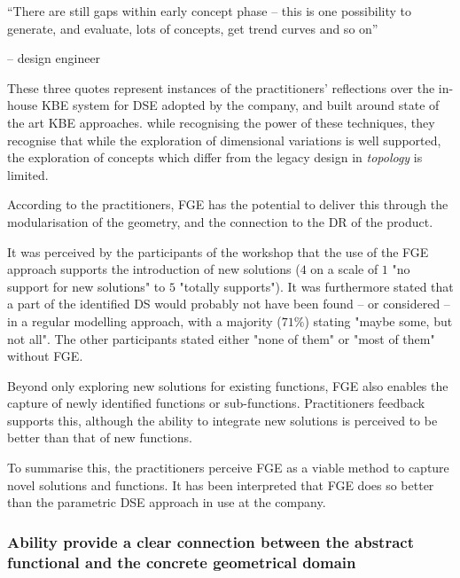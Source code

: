 \documentclass[preprints,article,accept,moreauthors,pdftex]{Definitions/mdpi}
\begin{document}
\begin{center}
    “There are still gaps within early concept phase – this is one possibility to generate, and evaluate, lots of concepts, get trend curves and so on” 
\end{center}
\begin{flushright}
    -- design engineer
\end{flushright}
These three quotes represent instances of the practitioners' reflections over the in-house \ac{KBE} system for DSE adopted by the company, and built around state of the art KBE approaches.
while recognising the power of these techniques, they recognise that while the exploration of dimensional variations is well supported, the exploration of concepts which differ from the legacy design in \textit{topology} is limited.

According to the practitioners, FGE has the potential to deliver this through the modularisation of the geometry, and the connection to the \ac{DR} of the product.


It was perceived by the participants of the workshop that the use of the \ac{FGE} approach supports the introduction of new solutions ($4$ on a scale of $1$ "no support for new solutions" to $5$ "totally supports").
It was furthermore stated that a part of the identified \ac{DS} would probably not have been found -- or considered -- in a regular modelling approach, with a majority ($71\%$) stating "maybe some, but not all".
The other participants stated either "none of them" or "most of them" without \ac{FGE}.

Beyond only exploring new solutions for existing functions, \ac{FGE} also enables the capture of newly identified functions or sub-functions.
Practitioners feedback supports this, although the ability to integrate new solutions is perceived to be better than that of new functions.

To summarise this, the practitioners perceive FGE as a viable method to capture novel solutions and functions.
It has been interpreted that FGE does so better than the parametric DSE approach in use at the company.




\subsubsection{Ability provide a clear connection between the abstract functional and the concrete geometrical domain }
\end{document}
